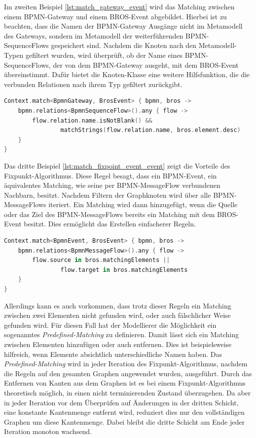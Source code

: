 Im zweiten Beispiel \cref{lst:match_gateway_event} wird das Matching zwischen einem BPMN-Gateway und einem BROS-Event abgebildet.
Hierbei ist zu beachten, dass die Namen der BPMN-Gateway Ausgänge nicht im Metamodell des Gateways, sondern im Metamodell der weiterführenden BPMN-SequenceFlows gespeichert sind.
Nachdem die Knoten nach den Metamodell-Typen gefiltert wurden, wird überprüft, ob der Name eines BPMN-SequenceFlows, der von dem BPMN-Gateway ausgeht, mit dem BROS-Event übereinstimmt.
Dafür bietet die Knoten-Klasse eine weitere Hilfsfunktion, die die verbunden Relationen nach ihrem Typ gefiltert zurückgibt.

\begin{lstlisting}[language=Kotlin, caption=Matching Regel von einem BPMN-Gateway und einem BROS-Event, label=lst:match_gateway_event]
Context.match<BpmnGateway, BrosEvent> { bpmn, bros ->
    bpmn.relations<BpmnSequenceFlow>().any { flow ->
        flow.relation.name.isNotBlank() &&
                matchStrings(flow.relation.name, bros.element.desc)
    }
}
\end{lstlisting}

Das dritte Beispiel \cref{lst:match_fixpoint_event_event} zeigt die Vorteile des Fixpunkt-Algorithmus.
Diese Regel besagt, dass ein BPMN-Event, ein äquivalentes Matching, wie seine per BPMN-MessageFlow verbundenen Nachbarn, besitzt.
Nachdem Filtern der Graphknoten wird über alle BPMN-MessageFlows iteriert.
Ein Matching wird dann hinzugefügt, wenn die Quelle oder das Ziel des BPMN-MessageFlows bereits ein Matching mit dem BROS-Event besitzt.
Dies ermöglicht das Erstellen einfacherer Regeln.

\begin{lstlisting}[language=Kotlin, caption=Fixpunkt Matching Regel von einem BPMN-BpmnEvent und einem BROS-Event, label=lst:match_fixpoint_event_event]
Context.match<BpmnEvent, BrosEvent> { bpmn, bros ->
    bpmn.relations<BpmnMessageFlow>().any { flow ->
        flow.source in bros.matchingElements ||
                flow.target in bros.matchingElements
    }
}
\end{lstlisting}

Allerdings kann es auch vorkommen, dass trotz dieser Regeln ein Matching zwischen zwei Elementen nicht gefunden wird, oder auch fälschlicher Weise gefunden wird.
Für diesen Fall hat der Modellierer die Möglichkeit ein sogenanntes \emph{Predefined-Matching} zu definieren.
Damit lässt sich ein Matching zwischen Elementen hinzufügen oder auch entfernen.
Dies ist beispielsweise hilfreich, wenn Elemente absichtlich unterschiedliche Namen haben.
Das \emph{Predefined-Matching} wird in jeder Iteration des Fixpunkt-Algorithmus, nachdem die Regeln auf den gesamten Graphen angewendet wurden, ausgeführt.
Durch das Entfernen von Kanten aus dem Graphen ist es bei einem Fixpunkt-Algorithmus theoretisch möglich, in einen nicht terminierenden Zustand überzugehen.
Da aber in jeder Iteration vor dem Überprüfen auf Änderungen in der dritten Schicht, eine konstante Kantenmenge entfernt wird, reduziert dies nur den vollständigen Graphen um diese Kantenmenge.
Dabei bleibt die dritte Schicht am Ende jeder Iteration monoton wachsend. 

